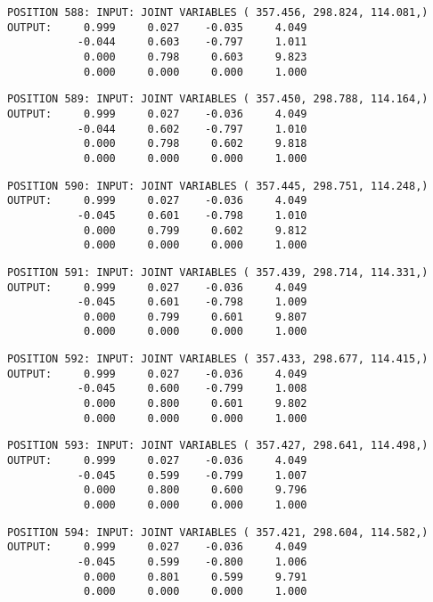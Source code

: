 \begin{verbatim}
POSITION 588: INPUT: JOINT VARIABLES ( 357.456, 298.824, 114.081,)
OUTPUT:     0.999     0.027    -0.035     4.049
           -0.044     0.603    -0.797     1.011
            0.000     0.798     0.603     9.823
            0.000     0.000     0.000     1.000
\end{verbatim} \pagebreak[1]\begin{verbatim}
POSITION 589: INPUT: JOINT VARIABLES ( 357.450, 298.788, 114.164,)
OUTPUT:     0.999     0.027    -0.036     4.049
           -0.044     0.602    -0.797     1.010
            0.000     0.798     0.602     9.818
            0.000     0.000     0.000     1.000
\end{verbatim} \pagebreak[1]\begin{verbatim}
POSITION 590: INPUT: JOINT VARIABLES ( 357.445, 298.751, 114.248,)
OUTPUT:     0.999     0.027    -0.036     4.049
           -0.045     0.601    -0.798     1.010
            0.000     0.799     0.602     9.812
            0.000     0.000     0.000     1.000
\end{verbatim} \pagebreak[1]\begin{verbatim}
POSITION 591: INPUT: JOINT VARIABLES ( 357.439, 298.714, 114.331,)
OUTPUT:     0.999     0.027    -0.036     4.049
           -0.045     0.601    -0.798     1.009
            0.000     0.799     0.601     9.807
            0.000     0.000     0.000     1.000
\end{verbatim} \pagebreak[1]\begin{verbatim}
POSITION 592: INPUT: JOINT VARIABLES ( 357.433, 298.677, 114.415,)
OUTPUT:     0.999     0.027    -0.036     4.049
           -0.045     0.600    -0.799     1.008
            0.000     0.800     0.601     9.802
            0.000     0.000     0.000     1.000
\end{verbatim} \pagebreak[1]\begin{verbatim}
POSITION 593: INPUT: JOINT VARIABLES ( 357.427, 298.641, 114.498,)
OUTPUT:     0.999     0.027    -0.036     4.049
           -0.045     0.599    -0.799     1.007
            0.000     0.800     0.600     9.796
            0.000     0.000     0.000     1.000
\end{verbatim} \pagebreak[1]\begin{verbatim}
POSITION 594: INPUT: JOINT VARIABLES ( 357.421, 298.604, 114.582,)
OUTPUT:     0.999     0.027    -0.036     4.049
           -0.045     0.599    -0.800     1.006
            0.000     0.801     0.599     9.791
            0.000     0.000     0.000     1.000
\end{verbatim} \pagebreak[1]\begin{verbatim}

\end{verbatim}
